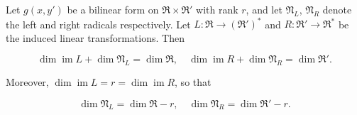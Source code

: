 Let $g(x, y')$ be a bilinear form on $\mathfrak{R} \times \mathfrak{R}'$ with rank $r$, and let $\mathfrak{N}_L$, $\mathfrak{N}_R$ denote the left and right radicals respectively. Let $L: \mathfrak{R} \to (\mathfrak{R}')^*$ and $R: \mathfrak{R}' \to \mathfrak{R}^*$ be the induced linear transformations. Then

$$\dim \operatorname{im} L + \dim \mathfrak{N}_L = \dim \mathfrak{R}, \quad \dim \operatorname{im} R + \dim \mathfrak{N}_R = \dim \mathfrak{R}'.$$

Moreover, $\dim \operatorname{im} L = r = \dim \operatorname{im} R$, so that

$$\dim \mathfrak{N}_L = \dim \mathfrak{R} - r, \quad \dim \mathfrak{N}_R = \dim \mathfrak{R}' - r.$$
